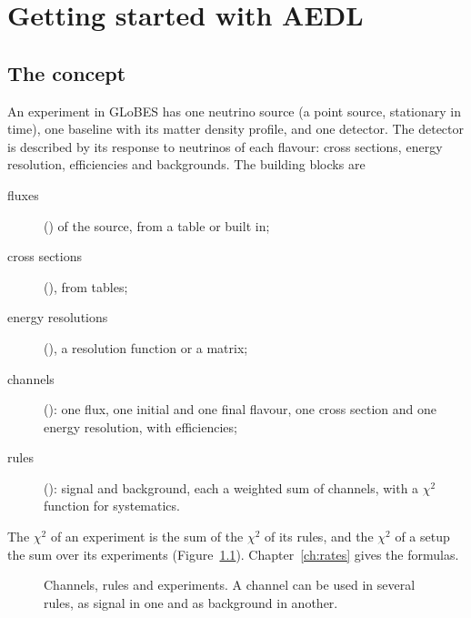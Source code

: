 \chapter{Getting started with AEDL}\label{ch:aedl-intro}

\section{The concept}

An experiment in GLoBES has one neutrino source (a point source, stationary
in time), one baseline with its matter density profile, and one detector. The
detector is described by its response to neutrinos of each flavour: cross
sections, energy resolution, efficiencies and backgrounds. The building blocks
are
\begin{description}
\item[fluxes] () of the source, from a table or built in;
\item[cross sections] (), from tables;
\item[energy resolutions] (), a resolution function or a matrix;
\item[channels] (): one flux, one initial and one final flavour,
  one cross section and one energy resolution, with efficiencies;
\item[rules] (): signal and background, each a weighted sum of
  channels, with a $\chi^2$ function for systematics.
\end{description}
The $\chi^2$ of an experiment is the sum of the $\chi^2$ of its rules, and the
$\chi^2$ of a setup the sum over its experiments (Figure~\ref{fig:concept}).
Chapter~\ref{ch:rates} gives the formulas.

\begin{figure}[t]
\centering
{}
\caption{Channels, rules and experiments. A channel can be used in several
rules, as signal in one and as background in another.}
\label{fig:concept}
\end{figure}

